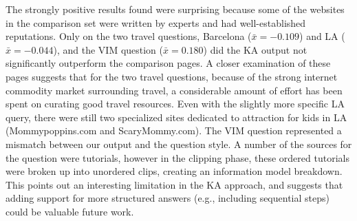 The strongly positive results found were surprising because some of the websites in the comparison set were written by experts and had well-established reputations. Only on the two travel questions, Barcelona ($\bar{x} = -0.109$) and LA ($\bar{x} = -0.044$), and the VIM question ($\bar{x} = 0.180$) did the KA output not significantly outperform the comparison pages. A closer examination of these pages suggests that for the two travel questions, because of the strong internet commodity market surrounding travel, a considerable amount of effort has been spent on curating good travel resources. Even with the slightly more specific LA query, there were still two specialized sites dedicated to attraction for kids in LA (Mommypoppins.com and ScaryMommy.com). The VIM question represented a mismatch between our output and the question style. A number of the sources for the question were tutorials, however in the clipping phase, these ordered tutorials were broken up into unordered clips, creating an information model breakdown. This points out an interesting limitation in the KA approach, and suggests that adding support for more structured answers (e.g., including sequential steps) could be valuable future work. 



